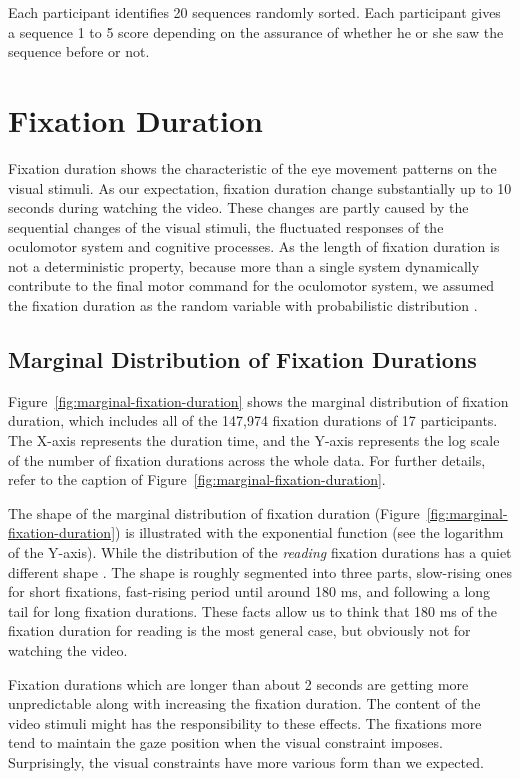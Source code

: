 \documentclass[10pt,letterpaper]{article}
\begin{document}
Each participant identifies 20 sequences randomly sorted. Each participant gives a sequence 1 to 5 score depending on the assurance of whether he or she saw the sequence before or not. 

\section{Fixation Duration}

Fixation duration shows the characteristic of the eye movement patterns on the visual stimuli. As our expectation, fixation duration change substantially up to 10 seconds during watching the video. These changes are partly caused by the sequential changes of the visual stimuli, the fluctuated responses of the oculomotor system and cognitive processes. As the length of fixation duration is not a deterministic property, because more than a single system dynamically contribute to the final motor command for the oculomotor system, we assumed the fixation duration as the random variable with probabilistic distribution \cite{Rayner1998,Reichle2004,Reichle2006}.

\subsection{Marginal Distribution of Fixation Durations}

Figure~\ref{fig:marginal-fixation-duration} shows the marginal distribution of fixation duration, which includes all of the 147,974 fixation durations of 17 participants. The X-axis represents the duration time, and the Y-axis represents the log scale of the number of fixation durations across the whole data. For further details, refer to the caption of Figure~\ref{fig:marginal-fixation-duration}.

The shape of the marginal distribution of fixation duration (Figure~\ref{fig:marginal-fixation-duration}) is illustrated with the exponential function (see the logarithm of the Y-axis). While the distribution of the \textit{reading} fixation durations has a quiet different shape \cite{Feng2006}. The shape is roughly segmented into three parts, slow-rising ones for short fixations, fast-rising period until around 180 ms, and following a long tail for long fixation durations. These facts allow us to think that 180 ms of the fixation duration for reading is the most general case, but obviously not for watching the video.

Fixation durations which are longer than about 2 seconds are getting more unpredictable along with increasing the fixation duration. The content of the video stimuli might has the responsibility to these effects. The fixations more tend to maintain the gaze position when the visual constraint imposes. Surprisingly, the visual constraints have more various form than we expected.
\end{document}
